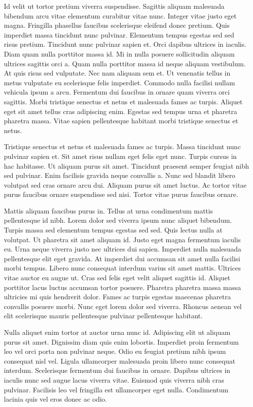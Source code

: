 \documentclass[11pt,a4paper]{article}
\begin{document}
Id velit ut tortor pretium viverra suspendisse. Sagittis aliquam malesuada bibendum arcu vitae elementum curabitur vitae nunc. Integer vitae justo eget magna. Fringilla phasellus faucibus scelerisque eleifend donec pretium. Quis imperdiet massa tincidunt nunc pulvinar. Elementum tempus egestas sed sed risus pretium. Tincidunt nunc pulvinar sapien et. Orci dapibus ultrices in iaculis. Diam quam nulla porttitor massa id. Mi in nulla posuere sollicitudin aliquam ultrices sagittis orci a. Quam nulla porttitor massa id neque aliquam vestibulum. At quis risus sed vulputate. Nec nam aliquam sem et. Ut venenatis tellus in metus vulputate eu scelerisque felis imperdiet. Commodo nulla facilisi nullam vehicula ipsum a arcu. Fermentum dui faucibus in ornare quam viverra orci sagittis. Morbi tristique senectus et netus et malesuada fames ac turpis. Aliquet eget sit amet tellus cras adipiscing enim. Egestas sed tempus urna et pharetra pharetra massa. Vitae sapien pellentesque habitant morbi tristique senectus et netus.

Tristique senectus et netus et malesuada fames ac turpis. Massa tincidunt nunc pulvinar sapien et. Sit amet risus nullam eget felis eget nunc. Turpis cursus in hac habitasse. Ut aliquam purus sit amet. Tincidunt praesent semper feugiat nibh sed pulvinar. Enim facilisis gravida neque convallis a. Nunc sed blandit libero volutpat sed cras ornare arcu dui. Aliquam purus sit amet luctus. Ac tortor vitae purus faucibus ornare suspendisse sed nisi. Tortor vitae purus faucibus ornare.

Mattis aliquam faucibus purus in. Tellus at urna condimentum mattis pellentesque id nibh. Lorem dolor sed viverra ipsum nunc aliquet bibendum. Turpis massa sed elementum tempus egestas sed sed. Quis lectus nulla at volutpat. Ut pharetra sit amet aliquam id. Justo eget magna fermentum iaculis eu. Urna neque viverra justo nec ultrices dui sapien. Imperdiet nulla malesuada pellentesque elit eget gravida. At imperdiet dui accumsan sit amet nulla facilisi morbi tempus. Libero nunc consequat interdum varius sit amet mattis. Ultrices vitae auctor eu augue ut. Cras sed felis eget velit aliquet sagittis id. Aliquet porttitor lacus luctus accumsan tortor posuere. Pharetra pharetra massa massa ultricies mi quis hendrerit dolor. Fames ac turpis egestas maecenas pharetra convallis posuere morbi. Nunc eget lorem dolor sed viverra. Rhoncus aenean vel elit scelerisque mauris pellentesque pulvinar pellentesque habitant.

Nulla aliquet enim tortor at auctor urna nunc id. Adipiscing elit ut aliquam purus sit amet. Dignissim diam quis enim lobortis. Imperdiet proin fermentum leo vel orci porta non pulvinar neque. Odio eu feugiat pretium nibh ipsum consequat nisl vel. Ligula ullamcorper malesuada proin libero nunc consequat interdum. Scelerisque fermentum dui faucibus in ornare. Dapibus ultrices in iaculis nunc sed augue lacus viverra vitae. Euismod quis viverra nibh cras pulvinar. Facilisis leo vel fringilla est ullamcorper eget nulla. Condimentum lacinia quis vel eros donec ac odio.
\end{document}
